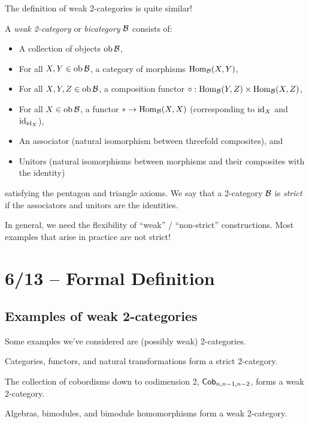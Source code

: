 The definition of weak 2-categories is quite similar!

\begin{dfn}
	A \emph{weak 2-category} or \emph{bicategory} $\mathcal{B}$ consists of:
	\begin{itemize}
		\item A collection of objects $\operatorname{ob} \mathcal{B}$,
		\item For all $X, Y \in \operatorname{ob} \mathcal{B}$, a category of morphisms $\operatorname{Hom}_{\mathcal{B}}(X, Y)$,
		\item For all $X, Y, Z \in \operatorname{ob} \mathcal{B}$, a composition functor $\circ: \operatorname{Hom}_{\mathcal{B}}(Y, Z) \times \operatorname{Hom}_{\mathcal{B}}(X, Z)$,
		\item For all $X \in \operatorname{ob} \mathcal{B}$, a functor $* \to \operatorname{Hom}_{\mathcal{B}}(X, X)$ (corresponding to $\operatorname{id}_X$ and $\operatorname{id}_{\operatorname{id}_X}$),
		\item An associator (natural isomorphism between threefold composites), and
		\item Unitors (natural isomorphisms between morphisms and their composites with the identity)
	\end{itemize}
	satisfying the pentagon and triangle axioms.
	We say that a 2-category $\mathcal{B}$ is \emph{strict} if the associators and unitors are the identities.
\end{dfn}

In general, we need the flexibility of ``weak'' / ``non-strict'' constructions.
Most examples that arise in practice are not strict!

\section{6/13 -- Formal Definition}

\subsection{Examples of weak 2-categories}

Some examples we've considered are (possibly weak) 2-categories.

\begin{ex}
	Categories, functors, and natural transformations form a strict 2-category.
\end{ex}

\begin{ex}
	The collection of cobordisms down to codimension 2, $\mathsf{Cob}_{n,n-1,n-2}$, forms a weak 2-category.
\end{ex}

\begin{ex}
	Algebras, bimodules, and bimodule homomorphisms form a weak 2-category.
\end{ex}

